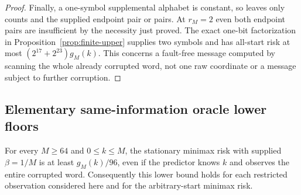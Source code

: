\begin{proof}
Finally, a one-symbol supplemental alphabet is constant, so leaves
only counts and the supplied endpoint pair or pairs. At $r_M=2$ even
both endpoint pairs are insufficient by the necessity just proved.
The exact one-bit factorization in
Proposition~\ref{prop:finite-upper} supplies two symbols and has
all-start risk at most $(2^{17}+2^{23})g_M(k)$. This concerns a
fault-free message computed by scanning the whole already corrupted
word, not one raw coordinate or a message subject to further corruption.
\end{proof}

\subsection{Elementary same-information oracle lower floors}

\begin{lemma}
\label{lem:oracle-floor}
For every $M\ge64$ and $0\le k\le M$, the stationary minimax risk
with supplied $\beta=1/M$ is at least $g_M(k)/96$, even if the predictor
knows $k$ and observes the entire corrupted word. Consequently this
lower bound holds for each restricted observation considered here and
for the arbitrary-start minimax risk.
\end{lemma}
